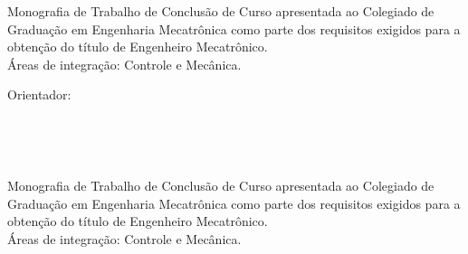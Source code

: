 \vspace*{2.5cm}

\begin{flushright}
\begin{minipage}{9.0cm}
Monografia de Trabalho de Conclusão de Curso apresentada ao
Colegiado de Graduação em Engenharia Mecatrônica
como  parte dos requisitos exigidos para a obtenção do título de
Engenheiro Mecatrônico.  \\
Áreas de integração: {Controle e Mecânica}.

\vspace*{1cm}

Orientador: \orientador \\
\end{minipage}
\end{flushright}

\vspace*{2.5cm}


\null\vfill

\begin{center}
\cidade\\\ano  %
\end{center}


\thispagestyle{empty}

\newpage

\vspace*{1.2cm}
\begin{center}
\large \autor\\%
\end{center}


\vspace*{1.8cm}

\begin{center}
{\sc  \titulo}
\end{center}

\vspace*{2.25cm}

\begin{flushright}
\begin{minipage}{9.0cm}
Monografia de Trabalho de Conclusão de Curso apresentada ao
Colegiado de Graduação em Engenharia Mecatrônica
como  parte dos requisitos exigidos para a obtenção do título de
Engenheiro Mecatrônico.  \\
Áreas de integração: {Controle e Mecânica}.\\


\vspace*{0.5cm}

\end{minipage}
\end{flushright}

